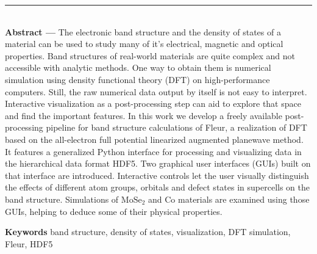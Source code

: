 \clearpage


\thispagestyle{empty}

\vspace*{\fill}
\noindent\rule[2pt]{\textwidth}{0.5pt}\\
{\textbf{Abstract ---}}
The electronic band structure and the density of states of a material can be used to study many of it's electrical, magnetic and optical properties. Band structures of real-world materials are quite complex and not accessible with analytic methods. One way to obtain them is numerical simulation using density functional theory (DFT) on high-performance computers.
Still, the raw numerical data output by itself is not easy to interpret.
Interactive visualization as a post-processing step can aid to explore that
space and find the important features. In this work we develop a freely
available post-processing pipeline for band structure calculations of Fleur, a
realization of DFT based on the all-electron full potential linearized augmented
planewave method. It features a generalized Python interface for processing and
visualizing data in the hierarchical data format HDF5. Two graphical user
interfaces (GUIs) built on that interface are introduced. Interactive controls
let the user visually distinguish the effects of different atom groups,
orbitals and defect states in supercells on the band structure. Simulations of
$\textrm{MoSe}_2$ and $\textrm{Co}$ materials are examined using those GUIs,
helping to deduce some of their physical properties.


{\textbf{Keywords}}
band structure, density of states, visualization, DFT simulation, Fleur, HDF5
\\

